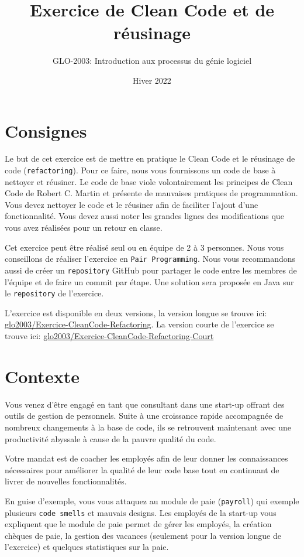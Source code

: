 \documentclass[french]{article}
\title{Exercice de Clean Code et de réusinage}
\author{GLO-2003: Introduction aux processus du génie logiciel}
\date{Hiver 2022}
\begin{document}
\maketitle

\section{Consignes}
Le but de cet exercice est de mettre en pratique le Clean Code et le réusinage de code (\texttt{refactoring}). Pour ce faire, nous vous fournissons un code de base à nettoyer et réusiner. Le code de base viole volontairement les principes de Clean Code de Robert C. Martin\cite{martinClean} et présente de mauvaises pratiques de programmation. Vous devez nettoyer le code et le réusiner afin de faciliter l'ajout d'une fonctionnalité. Vous devez aussi noter les grandes lignes des modifications que vous avez réalisées pour un retour en classe.

Cet exercice peut être réalisé seul ou en équipe de 2 à 3 personnes. Nous vous conseillons de réaliser l'exercice en \texttt{Pair Programming}. Nous vous recommandons aussi de créer un \texttt{repository} GitHub pour partager le code entre les membres de l'équipe et de faire un commit par étape. Une solution sera proposée en Java sur le \texttt{repository} de l'exercice.

L'exercice est disponible en deux versions, la version longue se trouve ici: \href{https://github.com/glo2003/Exercice-CleanCode-Refactoring}{glo2003/Exercice-CleanCode-Refactoring}. La version courte de l'exercice se trouve ici: \href{https://github.com/glo2003/Exercice-CleanCode-Refactoring-Court}{glo2003/Exercice-CleanCode-Refactoring-Court}

\section{Contexte}
Vous venez d'être engagé en tant que consultant dans une start-up offrant des outils de gestion de personnels. Suite à une croissance rapide accompagnée de nombreux changements à la base de code, ils se retrouvent maintenant avec une productivité abyssale à cause de la pauvre qualité du code.

Votre mandat est de coacher les employés afin de leur donner les connaissances nécessaires pour améliorer la qualité de leur code base tout en continuant de livrer de nouvelles fonctionnalités.

En guise d'exemple, vous vous attaquez au module de paie (\texttt{payroll}) qui exemple plusieurs \texttt{code smells} et mauvais designs. Les employés de la start-up vous expliquent que le module de paie permet de gérer les employés, la création chèques de paie, la gestion des vacances (seulement pour la version longue de l'exercice) et quelques statistiques sur la paie.
\end{document}
